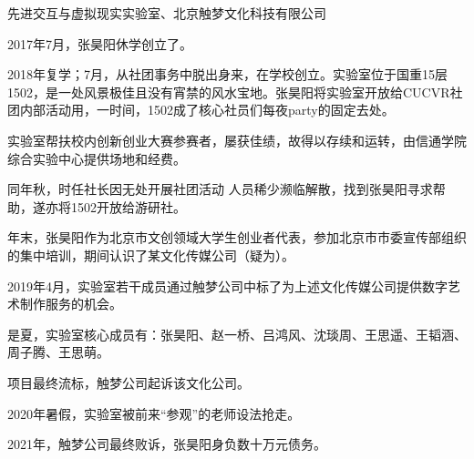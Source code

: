 \begin{section}{先进交互与虚拟现实实验室、北京触梦文化科技有限公司}
	\label{story:cucvr}

	2017年7月，张昊阳休学创立了。

	2018年复学；7月，从社团事务中脱出身来，在学校创立。实验室位于国重15层1502，是一处风景极佳且没有宵禁的风水宝地。张昊阳将实验室开放给CUCVR社团内部活动用，一时间，1502成了核心社员们每夜party的固定去处。

	实验室帮扶校内创新创业大赛参赛者，屡获佳绩，故得以存续和运转，由信通学院综合实验中心提供场地和经费。

	同年秋，时任社长因无处开展社团活动	人员稀少濒临解散，找到张昊阳寻求帮助，遂亦将1502开放给游研社。

	年末，张昊阳作为北京市文创领域大学生创业者代表，参加北京市市委宣传部组织的集中培训，期间认识了某文化传媒公司（疑为）。

	2019年4月，实验室若干成员通过触梦公司中标了为上述文化传媒公司提供数字艺术制作服务的机会。

	是夏，实验室核心成员有：张昊阳、赵一桥、吕鸿风、沈琰周、王思遥、王韬涵、周子腾、王思萌。

	项目最终流标，触梦公司起诉该文化公司。

	2020年暑假，实验室被前来“参观”的老师设法抢走。

	2021年，触梦公司最终败诉，张昊阳身负数十万元债务。
\end{section}